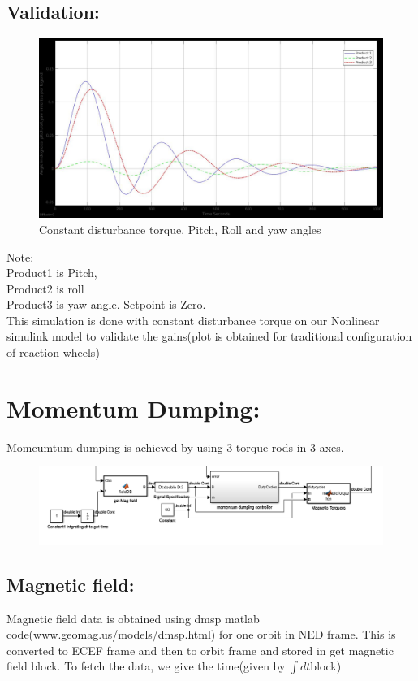 \documentclass[10pt,a4paper]{report}
\begin{document}
\section{Validation:}
\begin{figure}[H]
	\centering
	\includegraphics[width=1.0\linewidth]{simulation_at_constantTOrq_pryangles}
	\caption{Constant disturbance torque. Pitch, Roll and yaw angles}
	\label{Constant disturbance torque. Pitch, Roll and yaw angles}
\end{figure}
	Note: \\Product1 is Pitch, \\Product2 is roll \\ Product3 is yaw angle.
	Setpoint is Zero. \\
This simulation is done with constant disturbance torque on our Nonlinear simulink model to validate the gains(plot is obtained for traditional configuration of reaction wheels)
\chapter{Momentum Dumping:}
Momeumtum dumping is achieved by using 3 torque rods in 3 axes.
\begin{figure}[H]
	\centering
	\includegraphics[width=1.0\linewidth]{momentumDumping}
	\caption{}
	\label{fig:momentumdumping}
\end{figure}
\section{Magnetic field:}
Magnetic field data is obtained using dmsp matlab code(www.geomag.us/models/dmsp.html) for one orbit in NED frame. This is converted to ECEF frame and then to orbit frame and stored in get magnetic field block. To fetch the data, we give the time(given by $\int dt$block)\\
\end{document}
